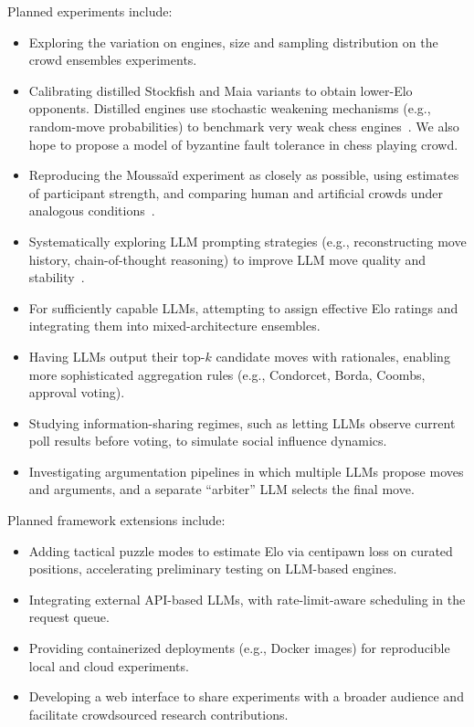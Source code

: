 \documentclass[format=acmsmall, review=false]{acmart}
\begin{document}
Planned experiments include:
\begin{itemize}
  \item Exploring the variation on engines, size and sampling distribution on the crowd ensembles experiments.
  \item Calibrating distilled Stockfish and Maia variants to obtain lower-Elo opponents. Distilled engines use stochastic weakening mechanisms (e.g., random-move probabilities) to benchmark very weak chess engines~\cite{murphy2019}. We also hope to propose a model of byzantine fault tolerance in chess playing crowd.
  \item Reproducing the Moussaïd experiment as closely as possible, using estimates of participant strength, and comparing human and artificial crowds under analogous conditions~\cite{moussaid2025}.
  \item Systematically exploring LLM prompting strategies (e.g., reconstructing move history, chain-of-thought reasoning) to improve LLM move quality and stability~\cite{dynomight2024}.
  \item For sufficiently capable LLMs, attempting to assign effective Elo ratings and integrating them into mixed-architecture ensembles.
  \item Having LLMs output their top-\(k\) candidate moves with rationales, enabling more sophisticated aggregation rules (e.g., Condorcet, Borda, Coombs, approval voting).
  \item Studying information-sharing regimes, such as letting LLMs observe current poll results before voting, to simulate social influence dynamics.
  \item Investigating argumentation pipelines in which multiple LLMs propose moves and arguments, and a separate ``arbiter'' LLM selects the final move.
\end{itemize}

Planned framework extensions include:
\begin{itemize}
  \item Adding tactical puzzle modes to estimate Elo via centipawn loss on curated positions, accelerating preliminary testing on LLM-based engines.
  \item Integrating external API-based LLMs, with rate-limit-aware scheduling in the request queue.
  \item Providing containerized deployments (e.g., Docker images) for reproducible local and cloud experiments.
  \item Developing a web interface to share experiments with a broader audience and facilitate crowdsourced research contributions.
\end{itemize}
\end{document}
